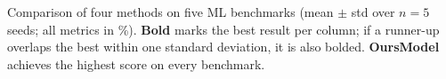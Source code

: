 \caption{Comparison of four methods on five ML benchmarks (mean $\pm$ std over $n=5$ seeds; all metrics in \%). \textbf{Bold} marks the best result per column; if a runner-up overlaps the best within one standard deviation, it is also bolded. \textbf{OursModel} achieves the highest score on every benchmark.}
